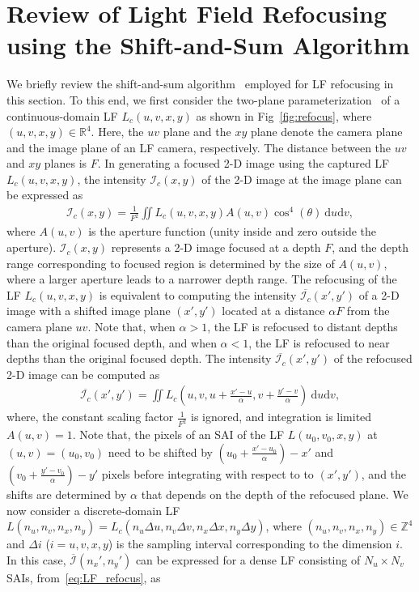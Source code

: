 \section{Review of Light Field Refocusing using the Shift-and-Sum Algorithm}
\label{sec:shiftSumReview}
We briefly review the shift-and-sum algorithm~\cite{ng2005light} employed for LF refocusing in this section. To this end, we first consider the two-plane parameterization~\cite{levoy1996light} of a continuous-domain LF $L_c(u,v,x,y)$ as shown in Fig~\ref{fig:refocus}, where $(u,v,x,y)\in\mathbb{R}^4$. Here, the $uv$ plane and the $xy$ plane denote the camera plane and the image plane of an LF camera, respectively. The distance between the $uv$ and $xy$ planes is $F$. In generating a focused 2-D image using the captured LF $L_c(u,v,x,y)$, the intensity $\mathcal{I}_c(x,y)$ of the 2-D image at the image plane can be expressed as~\cite{ng2005light}
\begin{align}
\label{eq:LF_intensity}
\mathcal{I}_c(x,y) =\frac{1}{F^{2}}\iint L_c(u,v,x,y) A(u,v)\cos^{4}(\theta )\: \mathrm{d}u\mathrm{d}v,
\end{align}
where $A(u,v)$ is the aperture function (unity inside and zero outside the aperture). $\mathcal{I}_c(x,y)$ represents a 2-D image focused at a depth $F$, and the depth range corresponding to focused region is determined by the size of $A(u,v)$, where a larger aperture leads to a narrower depth range. The refocusing of the LF $L_c(u,v,x,y)$ is equivalent to computing the intensity $\overline{\mathcal{I}_c}(x',y')$ of a 2-D image with a shifted image plane $(x',y')$ located at a distance $\alpha F$ from the camera plane $uv$. Note that, when $\alpha>1$, the LF is refocused to distant depths than the original focused depth, and when $\alpha<1$, the LF is refocused to near depths than the original focused depth. The intensity $\overline{\mathcal{I}_c}(x',y')$ of the refocused 2-D image can be computed as~\cite{ng2005light}
\begin{align}
\label{eq:LF_refocus}
\overline{\mathcal{I}_c}\left( x',y'\right) =\iint L_c\left( u,v,u+\frac{x' -u}{\alpha } ,v+\frac{y' -v}{\alpha }\right) \: \mathrm{d}u\mathrm{d}v,
\end{align}
where, the constant scaling factor $\frac{1}{F^{2}}$ is ignored, and integration is limited $A(u,v)=1$. Note that, the pixels of an SAI of the LF $L( u_0,v_0,x,y)$ at $(u,v)=(u_0,v_0)$ need to be shifted by $(u_0+\frac{x' -u_0}{\alpha})-x'$ and $(v_0+\frac{y' -v_0}{\alpha})-y'$ pixels before integrating with respect to to $(x',y')$, and the shifts are determined by $\alpha$ that depends on the depth of the refocused plane. We now consider a discrete-domain LF $L(n_u,n_v,n_x,n_y)=L_c(n_u\Delta u,n_v\Delta v,n_x\Delta x,n_y\Delta y)$, where $(n_u,n_v,n_x,n_y)\in\mathbb{Z}^4$ and $\Delta i$ ($i=u,v,x,y$) is the sampling interval corresponding to the dimension $i$. In this case, $\overline{\mathcal{I}}\left( n_x' ,n_y'\right)$  can be expressed for a dense LF consisting of $N_u\times N_v$ SAIs, from~\eqref{eq:LF_refocus}, as~\cite{ng2005light}
